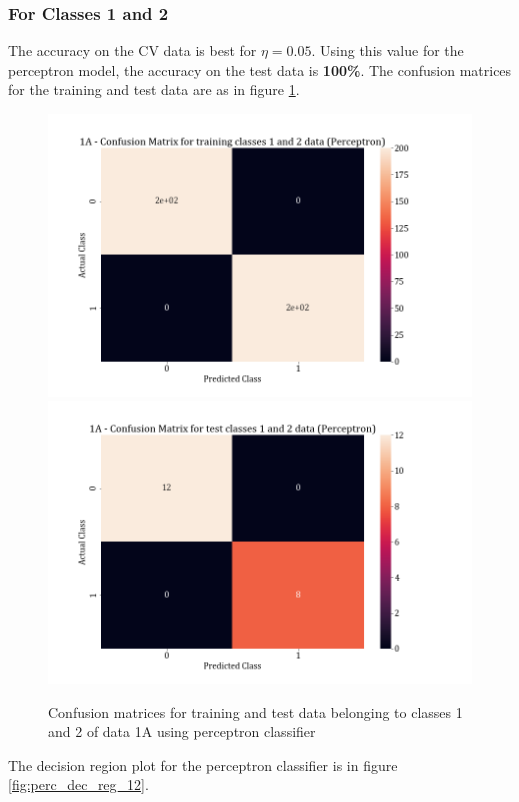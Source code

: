 \documentclass[11pt,a4paper]{article}
\begin{document}
\subsubsection{For Classes 1 and 2}

The accuracy on the CV data is best for $\eta = 0.05$. Using this value for the perceptron model, the accuracy on the test data is \textbf{100\%}. The confusion matrices for the training and test data are as in figure \ref{fig:perc_conf_12}.
\begin{figure}[H]
    \centering
    \includegraphics[scale=0.27]{images/perceptron_training classes 1 and 2_confmat.png}
    \includegraphics[scale = 0.27]{images/perceptron_test classes 1 and 2_confmat.png}
    \caption{Confusion matrices for training and test data belonging to classes 1 and 2 of data 1A using perceptron classifier}
    \label{fig:perc_conf_12}
\end{figure}
The decision region plot for the perceptron classifier is in figure \ref{fig:perc_dec_reg_12}.
\end{document}

